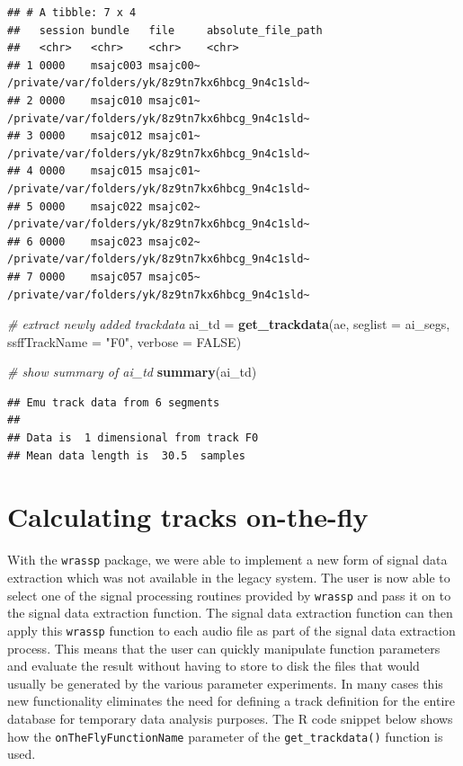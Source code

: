 \documentclass[]{book}
\newenvironment{Shaded}{\begin{snugshade}}{\end{snugshade}}
\newcommand{\CommentTok}[1]{\textcolor[rgb]{0.56,0.35,0.01}{\textit{#1}}}
\newcommand{\DataTypeTok}[1]{\textcolor[rgb]{0.13,0.29,0.53}{#1}}
\newcommand{\KeywordTok}[1]{\textcolor[rgb]{0.13,0.29,0.53}{\textbf{#1}}}
\newcommand{\NormalTok}[1]{#1}
\newcommand{\OtherTok}[1]{\textcolor[rgb]{0.56,0.35,0.01}{#1}}
\newcommand{\StringTok}[1]{\textcolor[rgb]{0.31,0.60,0.02}{#1}}
\begin{document}
\begin{verbatim}
## # A tibble: 7 x 4
##   session bundle   file     absolute_file_path                             
##   <chr>   <chr>    <chr>    <chr>                                          
## 1 0000    msajc003 msajc00~ /private/var/folders/yk/8z9tn7kx6hbcg_9n4c1sld~
## 2 0000    msajc010 msajc01~ /private/var/folders/yk/8z9tn7kx6hbcg_9n4c1sld~
## 3 0000    msajc012 msajc01~ /private/var/folders/yk/8z9tn7kx6hbcg_9n4c1sld~
## 4 0000    msajc015 msajc01~ /private/var/folders/yk/8z9tn7kx6hbcg_9n4c1sld~
## 5 0000    msajc022 msajc02~ /private/var/folders/yk/8z9tn7kx6hbcg_9n4c1sld~
## 6 0000    msajc023 msajc02~ /private/var/folders/yk/8z9tn7kx6hbcg_9n4c1sld~
## 7 0000    msajc057 msajc05~ /private/var/folders/yk/8z9tn7kx6hbcg_9n4c1sld~
\end{verbatim}

\begin{Shaded}
\begin{Highlighting}[]
\CommentTok{# extract newly added trackdata}
\NormalTok{ai_td =}\StringTok{ }\KeywordTok{get_trackdata}\NormalTok{(ae,}
                      \DataTypeTok{seglist =}\NormalTok{ ai_segs,}
                      \DataTypeTok{ssffTrackName =} \StringTok{"F0"}\NormalTok{,}
                      \DataTypeTok{verbose =} \OtherTok{FALSE}\NormalTok{)}

\CommentTok{# show summary of ai_td}
\KeywordTok{summary}\NormalTok{(ai_td)}
\end{Highlighting}
\end{Shaded}

\begin{verbatim}
## Emu track data from 6 segments
## 
## Data is  1 dimensional from track F0 
## Mean data length is  30.5  samples
\end{verbatim}

\hypertarget{calculating-tracks-on-the-fly}{%
\section{Calculating tracks on-the-fly}\label{calculating-tracks-on-the-fly}}

With the \texttt{wrassp} package, we were able to implement a new form of signal data extraction which was not available in the legacy system. The user is now able to select one of the signal processing routines provided by \texttt{wrassp} and pass it on to the signal data extraction function. The signal data extraction function can then apply this \texttt{wrassp} function to each audio file as part of the signal data extraction process. This means that the user can quickly manipulate function parameters and evaluate the result without having to store to disk the files that would usually be generated by the various parameter experiments. In many cases this new functionality eliminates the need for defining a track definition for the entire database for temporary data analysis purposes. The R code snippet below shows how the \texttt{onTheFlyFunctionName} parameter of the \texttt{get\_trackdata()} function is used.
\end{document}
